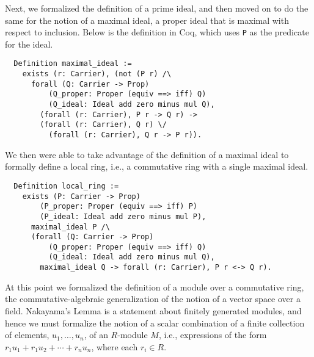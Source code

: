 \documentclass{article}
\begin{document}
Next, we formalized the definition of a  prime ideal, and then 
moved on to do the same for the notion of a maximal ideal, a proper ideal 
that is maximal with respect to inclusion. Below is the definition in Coq,
which uses \texttt{P} as the predicate for the ideal.

\begin{verbatim}
  Definition maximal_ideal :=
    exists (r: Carrier), (not (P r) /\
      forall (Q: Carrier -> Prop)
          (Q_proper: Proper (equiv ==> iff) Q)
          (Q_ideal: Ideal add zero minus mul Q),
        (forall (r: Carrier), P r -> Q r) ->
        (forall (r: Carrier), Q r) \/
          (forall (r: Carrier), Q r -> P r)).
\end{verbatim}

We then were able to take advantage of the definition of a maximal ideal
to formally define a local
ring, i.e., a commutative ring with a single maximal ideal.
 
\begin{verbatim}
  Definition local_ring :=
    exists (P: Carrier -> Prop)
        (P_proper: Proper (equiv ==> iff) P)
        (P_ideal: Ideal add zero minus mul P),
      maximal_ideal P /\
      (forall (Q: Carrier -> Prop)
          (Q_proper: Proper (equiv ==> iff) Q)
          (Q_ideal: Ideal add zero minus mul Q),
        maximal_ideal Q -> forall (r: Carrier), P r <-> Q r).
\end{verbatim}


At this point we formalized the definition of a module over a commutative ring,
the commutative-algebraic generalization of the notion of a vector space over a
field. Nakayama's Lemma is a statement about finitely generated modules, and
hence we must formalize the notion of a scalar combination of a finite
collection of elements, $u_1, \ldots, u_n$, of an $R$-module $M$, i.e.,
expressions of the form $r_1 u_1 + r_1 u_2 + \cdots + r_n u_n$, where each
$r_i \in R$.
\end{document}
